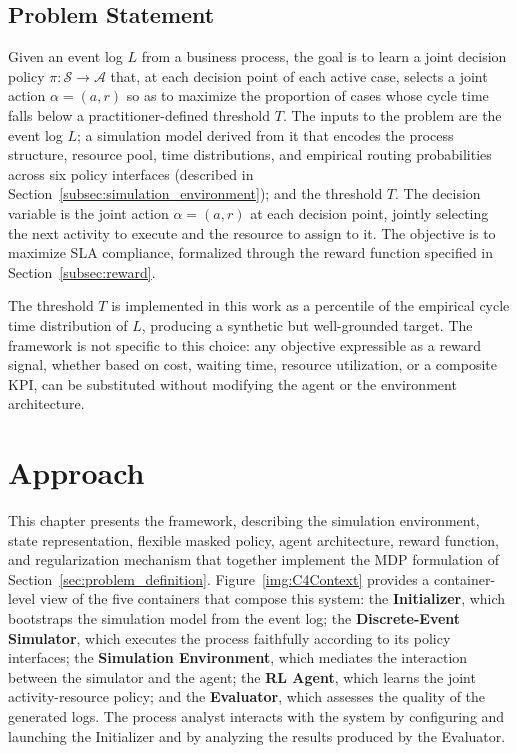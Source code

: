 \documentclass[journal,onecolumn]{IEEEtran}
\begin{document}
\subsection{Problem Statement}
\label{subsec:problem_statement}

Given an event log $L$ from a business process, the goal is to
learn a joint decision policy $\pi: \mathcal{S} \rightarrow
\mathcal{A}$ that, at each decision point of each active case,
selects a joint action $\alpha = (a, r)$ so as to maximize the
proportion of cases whose cycle time falls below a
practitioner-defined threshold $T$. The inputs to the problem
are the event log $L$; a simulation model derived from it that
encodes the process structure, resource pool, time distributions,
and empirical routing probabilities across six policy interfaces
(described in Section~\ref{subsec:simulation_environment}); and
the threshold $T$. The decision variable is the joint action
$\alpha = (a, r)$ at each decision point, jointly selecting the
next activity to execute and the resource to assign to it. The
objective is to maximize SLA compliance, formalized through the
reward function specified in Section~\ref{subsec:reward}.

The threshold $T$ is implemented in this work as a
percentile of the empirical cycle time distribution of $L$,
producing a synthetic but well-grounded target. The framework
is not specific to this choice: any objective expressible as
a reward signal, whether based on cost, waiting time, resource
utilization, or a composite KPI, can be substituted without
modifying the agent or the environment architecture.


\section{Approach}
\label{sec:approach}

This chapter presents the framework, describing the simulation
environment, state representation, flexible masked policy, agent
architecture, reward function, and regularization mechanism that
together implement the MDP formulation of
Section~\ref{sec:problem_definition}. Figure~\ref{img:C4Context}
provides a container-level view of the five containers that compose
this system: the \textbf{Initializer}, which bootstraps the simulation
model from the event log; the \textbf{Discrete-Event Simulator},
which executes the process faithfully according to its policy
interfaces; the \textbf{Simulation Environment}, which mediates
the interaction between the simulator and the agent; the
\textbf{RL Agent}, which learns the joint activity-resource
policy; and the \textbf{Evaluator}, which assesses the quality
of the generated logs. The process analyst interacts with the
system by configuring and launching the Initializer and by
analyzing the results produced by the Evaluator.
\end{document}
